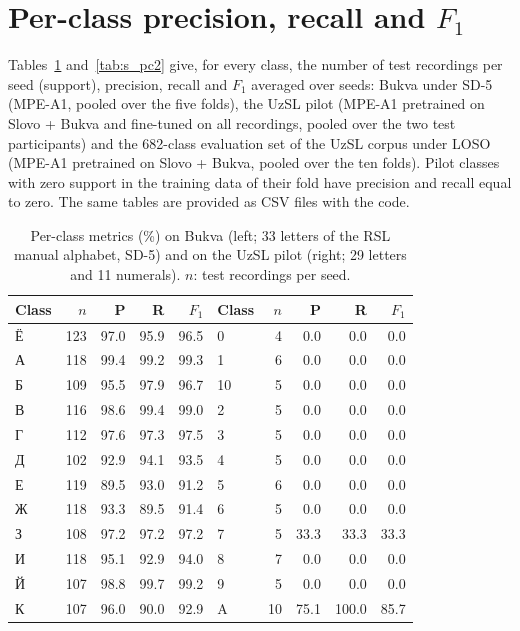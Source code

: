\documentclass[a4paper,10pt]{article}
\newcommand{\ruT}[1]{{\fontencoding{T2A}\selectfont #1}}
\begin{document}
\section{Per-class precision, recall and $F_1$}
Tables~\ref{tab:s_pc1} and~\ref{tab:s_pc2} give, for every class, the number of test recordings per seed (support), precision, recall and $F_1$ averaged over seeds: Bukva under SD-5 (MPE-A1, pooled over the five folds), the UzSL pilot (MPE-A1 pretrained on Slovo + Bukva and fine-tuned on all recordings, pooled over the two test participants) and the 682-class evaluation set of the UzSL corpus under LOSO (MPE-A1 pretrained on Slovo + Bukva, pooled over the ten folds). Pilot classes with zero support in the training data of their fold have precision and recall equal to zero. The same tables are provided as CSV files with the code.
\begin{table}[H]
\caption{Per-class metrics (\%) on Bukva (left; 33 letters of the RSL manual alphabet, SD-5) and on the UzSL pilot (right; 29 letters and 11 numerals). $n$: test recordings per seed.}\label{tab:s_pc1}
\centering
\scriptsize
\begin{tabular}{lrrrr|lrrrr}
\toprule
\textbf{Class} & \textbf{$n$} & \textbf{P} & \textbf{R} & \textbf{$F_1$} & \textbf{Class} & \textbf{$n$} & \textbf{P} & \textbf{R} & \textbf{$F_1$} \\
\midrule
\ruT{Ё} & 123 & 97.0 & 95.9 & 96.5 & 0 & 4 & 0.0 & 0.0 & 0.0 \\
\ruT{А} & 118 & 99.4 & 99.2 & 99.3 & 1 & 6 & 0.0 & 0.0 & 0.0 \\
\ruT{Б} & 109 & 95.5 & 97.9 & 96.7 & 10 & 5 & 0.0 & 0.0 & 0.0 \\
\ruT{В} & 116 & 98.6 & 99.4 & 99.0 & 2 & 5 & 0.0 & 0.0 & 0.0 \\
\ruT{Г} & 112 & 97.6 & 97.3 & 97.5 & 3 & 5 & 0.0 & 0.0 & 0.0 \\
\ruT{Д} & 102 & 92.9 & 94.1 & 93.5 & 4 & 5 & 0.0 & 0.0 & 0.0 \\
\ruT{Е} & 119 & 89.5 & 93.0 & 91.2 & 5 & 6 & 0.0 & 0.0 & 0.0 \\
\ruT{Ж} & 118 & 93.3 & 89.5 & 91.4 & 6 & 5 & 0.0 & 0.0 & 0.0 \\
\ruT{З} & 108 & 97.2 & 97.2 & 97.2 & 7 & 5 & 33.3 & 33.3 & 33.3 \\
\ruT{И} & 118 & 95.1 & 92.9 & 94.0 & 8 & 7 & 0.0 & 0.0 & 0.0 \\
\ruT{Й} & 107 & 98.8 & 99.7 & 99.2 & 9 & 5 & 0.0 & 0.0 & 0.0 \\
\ruT{К} & 107 & 96.0 & 90.0 & 92.9 & A & 10 & 75.1 & 100.0 & 85.7 \\

\end{tabular}
\end{table}
\end{document}
